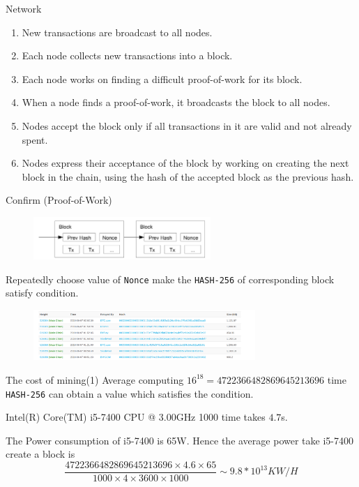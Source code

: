\documentclass[serif]{beamer}
\begin{document}
	
	\begin{frame}{Network}
		\begin{enumerate}[<+->]
			\item New transactions are broadcast to all nodes.
			\item Each node collects new transactions into a block.
			\item Each node works on finding a difficult proof-of-work for its block.
			\item When a node finds a proof-of-work, it broadcasts the block to all nodes.
			\item Nodes accept the block only if all transactions in it are valid and not already spent.
			\item Nodes express their acceptance of the block by working on creating the next block in the
			chain, using the hash of the accepted block as the previous hash.
		\end{enumerate}
		
	\end{frame}
		\begin{frame}{Confirm (Proof-of-Work)}
			\begin{figure}
				\includegraphics[width=0.6\textwidth]{proof}
				\label{fig:result3}
			\end{figure}
			Repeatedly choose value  of {\tt Nonce} make the {\tt HASH-256} of corresponding block satisfy 
			condition.
			\begin{example}
				\begin{figure}
					\includegraphics[width=0.75\textwidth]{example1}
					\label{fig:result4}
				\end{figure}
			\end{example}
			
		\end{frame}
	\begin{frame}{The cost of mining(1)}
		Average computing $16^{18}=4722366482869645213696$ time {\tt HASH-256} can obtain a value which satisfies the condition.
		\begin{example}	
			Intel(R) Core(TM) i5-7400 CPU @ 3.00GHz
			1000 time takes $4.7$s.	
		\end{example}
			The Power consumption of  i5-7400  is 65W. Hence the average power take  i5-7400 create a 
			block is $$\frac{4722366482869645213696\times 4.6\times 65}{1000\times 4\times 3600\times 1000}\sim 9.8*10^{13} KW/H$$
			
	\end{frame}
\end{document}
